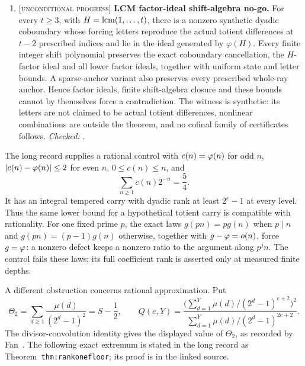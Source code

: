 \documentclass[11pt]{article}
\newcommand{\stag}[1]{{\normalfont\footnotesize\textsc{[#1]}}}
\begin{document}
\begin{enumerate}
\item\label{res:factorideal} \stag{unconditional progress}
\textbf{LCM factor-ideal shift-algebra no-go.}  For every $t\ge3$, with
$H=\operatorname{lcm}(1,\ldots,t)$, there is a nonzero synthetic dyadic coboundary whose
forcing letters reproduce the actual totient differences at $t-2$ prescribed
indices and lie in the ideal generated by $\varphi(H)$.  Every finite integer
shift polynomial preserves the exact coboundary cancellation, the $H$-factor
ideal and all lower factor ideals, together with uniform state and letter
bounds.  A sparse-anchor variant also preserves every prescribed whole-ray
anchor.  Hence factor ideals, finite shift-algebra closure and these bounds
cannot by themselves force a contradiction.  The witness is synthetic: its
letters are not claimed to be actual totient differences, nonlinear
combinations are outside the theorem, and no cofinal family of certificates
follows.
{\footnotesize\emph{Checked:}
.}
\end{enumerate}

The long record supplies a rational control with
$c(n)=\varphi(n)$ for odd $n$, $|c(n)-\varphi(n)|\le2$ for even $n$, $0\le c(n)\le n$,
and
\[
 \sum_{n\ge1}c(n)2^{-n}=\frac54.
\]
It has an integral tempered carry with dyadic rank at least $2^e-1$ at every
level. Thus the same lower bound for a hypothetical totient carry is
compatible with rationality. For one fixed prime $p$, the exact laws
$g(pn)=p g(n)$ when $p\mid n$ and $g(pn)=(p-1)g(n)$ otherwise, together
with $g-\varphi=o(n)$, force $g=\varphi$: a nonzero defect keeps a nonzero ratio
to the argument along $p^j n$. The control fails these laws; its full
coefficient rank is asserted only at measured finite depths.

A different obstruction concerns rational approximation. Put
\[
 \Theta_2=\sum_{d\ge1}\frac{\mu(d)}{(2^d-1)^2}=S-\frac12,
 \qquad
 Q(e,Y)=\frac{\bigl(\sum_{d=1}^{Y}\mu(d)/(2^d-1)^{e+2}\bigr)^2}
 {\sum_{d=1}^{Y}\mu(d)/(2^d-1)^{2e+2}}.
\]
The divisor-convolution identity gives the displayed value of $\Theta_2$,
as recorded by Fan~\cite{fan2026totient}. The following exact extremum is
stated in the long record as Theorem~\texttt{thm:rankonefloor}; its proof is
in the linked source.
\end{document}
